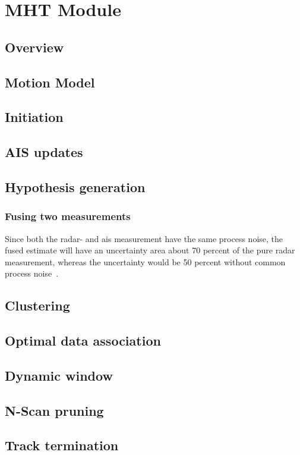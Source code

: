 
\chapter{MHT Module}\label{chapter:mht-module}

\section{Overview}

\section{Motion Model}\label{sec:motion-model}

\section{Initiation}

\section{AIS updates}

\section{Hypothesis generation}

\subsection{Fusing two measurements}
Since both the radar- and \gls{ais} measurement have the same process noise, the fused estimate will have an uncertainty area about 70 percent of the pure radar measurement, whereas the uncertainty would be 50 percent without common process noise~\cite{Bar-Shalom1986}.

\section{Clustering}

\section{Optimal data association}


\section{Dynamic window}

\section{N-Scan pruning}

\section{Track termination}